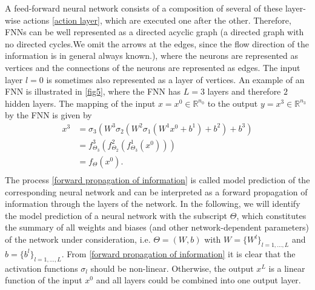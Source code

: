 A feed-forward neural network consists of a composition of several of these layer-wise actions \cref{action layer}, which are executed one after the other. Therefore, FNNs can be well represented as a directed acyclic graph (a directed graph with no directed cycles.We omit the arrows at the edges, since the flow direction of the information is in general always known.), where the neurons are represented as vertices and the connections of the neurons are represented as edges. The input layer $l=0$ is sometimes also represented as a layer of vertices. An example of an FNN is illustrated in \cref{fig5}, where the FNN has $L=3$ layers and therefore $2$ hidden layers. The mapping of the input $x = x^0 \in \mathbb{R}^{n_0}$ to the output $y = x^3 \in \mathbb{R}^{n_3}$ by the FNN is given by 
\begin{equation}
    \label{forward propagation of information}
    \begin{aligned}
        x^3 &=\sigma_{3} \left( W^{3} \sigma_{2} \left(  W^{2} \sigma_{1} \left( W^{1} x^{0}+b^{1}\right)+b^{2}\right)+b^{3}\right) \\
        & =f^{3}_{\Theta_3} \left( f^{2}_{\Theta_2} \left( f^{1}_{\Theta_3} \left(x^{0} \right) \right) \right) \\
        & = f_{\Theta} \left( x^{0}\right). \\
    \end{aligned}
\end{equation}
The process \cref{forward propagation of information} is called model prediction of the corresponding neural network and can be interpreted as a forward propagation of information through the layers of the network. In the following, we will identify the model prediction of a neural network with the subscript $\Theta$, which constitutes the summary of all weights and biases (and other network-dependent parameters) of the network under consideration, i.e. $\Theta = (W,b)$ with $W = \{ W^l \}_{l = 1, \ldots, L}$ and $b = \{ b^l \}_{l = 1, \ldots, L}$. From \cref{forward propagation of information} it is clear that the activation functions $\sigma_l$ should be non-linear. Otherwise, the output $x^L$ is a linear function of the input $x^0$ and all layers could be combined into one output layer. \\

